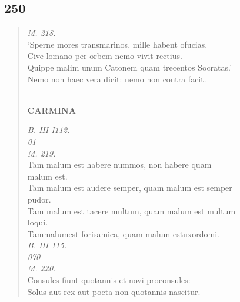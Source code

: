 \documentclass[11pt, a4paper]{report}
\begin{document}
            \subsection*{250}
      \begin{verse}
      \textit{M. 218.} \\ ‘Sperne mores transmarinos, mille habent ofucias. \\ Cive lomano per orbem nemo vivit rectius. \\ Quippe malim unum Catonem quam trecentos Socratas.’ \\ Nemo non haec vera dicit: nemo non contra facit. \\ 
        ﻿\pagebreak 
    \begin{center} \textbf{CARMINA} \end{center} \marginpar{[202]} \textit{B. III I112.} \\ \textit{01} \\ \textit{M. 219.} \\ Tam malum est habere nummos, non habere quam \\ malum est. \\ Tam malum est audere semper, quam malum est semper \\ pudor. \\ Tam malum est tacere multum, quam malum est multum \\ loqui. \\ Tammalumest forisamica, quam malum estuxordomi. \\ \textit{B. III 115.} \\ \textit{070} \\ \textit{M. 220.} \\ Consules fiunt quotannis et novi proconsules: \\ Solus aut rex aut poeta non quotannis nascitur. \\ 
      \end{verse}
  
\end{document}
